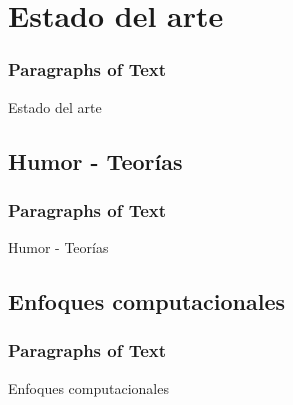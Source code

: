\section{Estado del arte} %

\begin{frame}
\frametitle{Paragraphs of Text}
Estado del arte
\end{frame}

\subsection{Humor - Teorías}
\begin{frame}
\frametitle{Paragraphs of Text}
Humor - Teorías
\end{frame}

\subsection{Enfoques computacionales}
\begin{frame}
\frametitle{Paragraphs of Text}
Enfoques computacionales
\end{frame}
